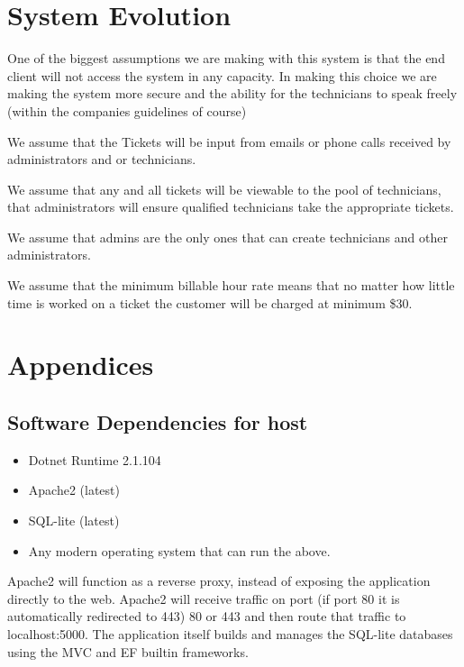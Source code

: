 \documentclass[letterpaper]{article}
\begin{document}
\section{System Evolution}
One of the biggest assumptions we are making with this system is that the end client will not access the system in any capacity. In making this choice we are making the system more secure and the ability for the technicians to speak freely (within the companies guidelines of course)


We assume that the Tickets will be input from emails or phone calls received by administrators and or technicians. 

We assume that any and all tickets will be viewable to the pool of technicians, that administrators will ensure qualified technicians take the appropriate tickets.

We assume that admins are the only ones that can create technicians and other administrators.

We assume that the minimum billable hour rate means that no matter how little time is worked on a ticket the customer will be charged at minimum \$30.
\pagebreak

\section{Appendices}

\subsection{Software Dependencies for host}
  \begin{itemize}
    \item Dotnet Runtime 2.1.104
    \item Apache2 (latest)
    \item SQL-lite (latest)
    \item Any modern operating system that can run the above.
  \end{itemize}

  Apache2 will function as a reverse proxy, instead of exposing the application directly to the web. Apache2 will receive traffic on port (if port 80 it is automatically redirected to 443) 80 or 443 and then route that traffic to localhost:5000. 
  The application itself builds and manages the SQL-lite databases using the \gls{MVC} and \gls{EF} builtin frameworks.
\end{document}

